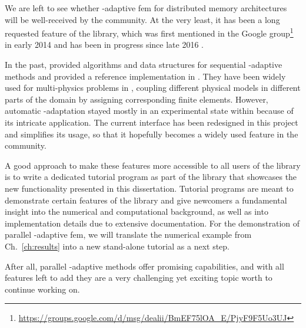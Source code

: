 
We are left to see whether \hp-adaptive \gls{fem} for distributed memory architectures will be well-received by the community. At the very least, it has been a long requested feature of the \dealii{} library, which was first mentioned in the \dealii{} Google group\footnote{\url{https://groups.google.com/d/msg/dealii/BmEF75lOA_E/PjyF9F5Uo3UJ}} in early 2014 and has been in progress since late 2016 \textcite{dealiiissue3511}.

In the past, \textcite{bangerth2009} provided algorithms and data structures for sequential \hp-adaptive methods and provided a reference implementation in \dealii{}. They have been widely used for multi-physics problems in \dealii{}, coupling different physical models in different parts of the domain by assigning corresponding finite elements. However, automatic \hp-adaptation stayed mostly in an experimental state within \dealii{} because of its intricate application. The current interface has been redesigned in this project and simplifies its usage, so that it hopefully becomes a widely used feature in the community.

A good approach to make these features more accessible to all users of the library is to write a dedicated tutorial program as part of the \dealii{} library that showcases the new functionality presented in this dissertation. Tutorial programs are meant to demonstrate certain features of the library and give newcomers a fundamental insight into the numerical and computational background, as well as into implementation details due to extensive documentation.
For the demonstration of parallel \hp-adaptive \gls{fem}, we will translate the numerical example from Ch.~\ref{ch:results} into a new stand-alone tutorial as a next step.






After all, parallel \hp-adaptive methods offer promising capabilities, and with all features left to add they are a very challenging yet exciting topic worth to continue working on.

